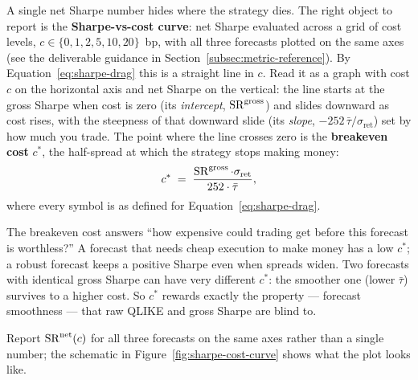 A single net Sharpe number hides where the strategy dies. The right object to report is the \textbf{Sharpe-vs-cost curve}: net Sharpe evaluated across a grid of cost levels, $c \in \{0, 1, 2, 5, 10, 20\}$~bp, with all three forecasts plotted on the same axes (see the deliverable guidance in Section~\ref{subsec:metric-reference}). By Equation~\eqref{eq:sharpe-drag} this is a straight line in $c$. Read it as a graph with cost $c$ on the horizontal axis and net Sharpe on the vertical: the line starts at the gross Sharpe when cost is zero (its \emph{intercept}, $\operatorname{SR}^{\text{gross}}$) and slides downward as cost rises, with the steepness of that downward slide (its \emph{slope}, $-252\,\bar\tau/\sigma_{\text{ret}}$) set by how much you trade. The point where the line crosses zero is the \textbf{breakeven cost} $c^\ast$, the half-spread at which the strategy stops making money:
\begin{equation}
\label{eq:breakeven}
c^\ast \;=\; \frac{\operatorname{SR}^{\text{gross}} \cdot \sigma_{\text{ret}}}{252 \cdot \bar\tau},
\end{equation}
where every symbol is as defined for Equation~\eqref{eq:sharpe-drag}.

\begin{intuition}
The breakeven cost answers ``how expensive could trading get before this forecast is worthless?'' A forecast that needs cheap execution to make money has a low $c^\ast$; a robust forecast keeps a positive Sharpe even when spreads widen. Two forecasts with identical gross Sharpe can have very different $c^\ast$: the smoother one (lower $\bar\tau$) survives to a higher cost. So $c^\ast$ rewards exactly the property --- forecast smoothness --- that raw QLIKE and gross Sharpe are blind to.
\end{intuition}

Report $\operatorname{SR}^{\text{net}}(c)$ for all three forecasts on the same axes rather than a single number; the schematic in Figure~\ref{fig:sharpe-cost-curve} shows what the plot looks like.

